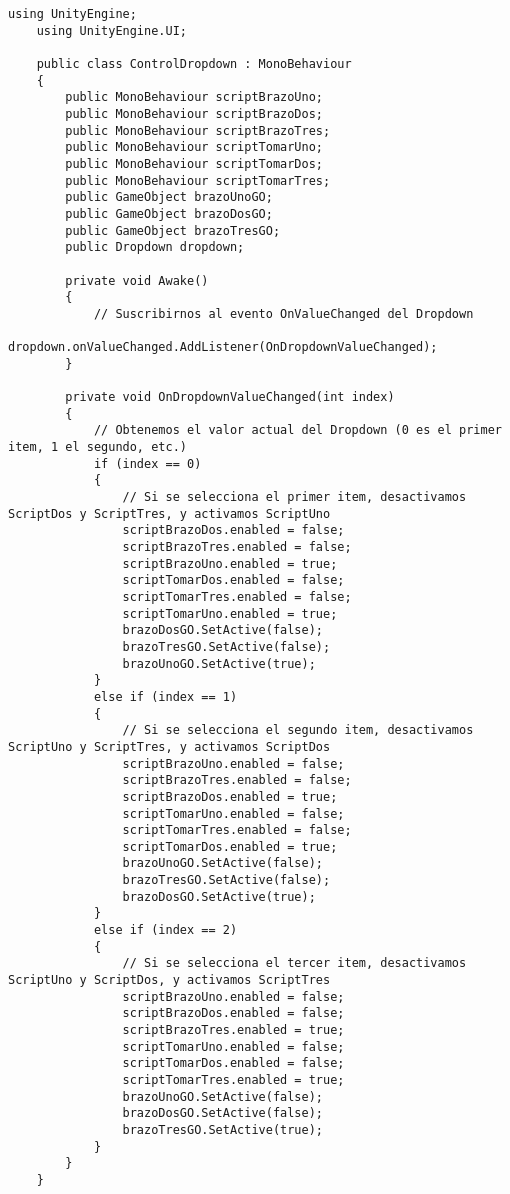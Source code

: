 \begin{lstlisting}[frame=single]
    using UnityEngine;
    using UnityEngine.UI;

    public class ControlDropdown : MonoBehaviour
    {
        public MonoBehaviour scriptBrazoUno;
        public MonoBehaviour scriptBrazoDos;
        public MonoBehaviour scriptBrazoTres;
        public MonoBehaviour scriptTomarUno;
        public MonoBehaviour scriptTomarDos;
        public MonoBehaviour scriptTomarTres;
        public GameObject brazoUnoGO;
        public GameObject brazoDosGO;
        public GameObject brazoTresGO;
        public Dropdown dropdown;

        private void Awake()
        {
            // Suscribirnos al evento OnValueChanged del Dropdown
            dropdown.onValueChanged.AddListener(OnDropdownValueChanged);
        }

        private void OnDropdownValueChanged(int index)
        {
            // Obtenemos el valor actual del Dropdown (0 es el primer item, 1 el segundo, etc.)
            if (index == 0)
            {
                // Si se selecciona el primer item, desactivamos ScriptDos y ScriptTres, y activamos ScriptUno
                scriptBrazoDos.enabled = false;
                scriptBrazoTres.enabled = false;
                scriptBrazoUno.enabled = true;
                scriptTomarDos.enabled = false;
                scriptTomarTres.enabled = false;
                scriptTomarUno.enabled = true;
                brazoDosGO.SetActive(false);
                brazoTresGO.SetActive(false);
                brazoUnoGO.SetActive(true);
            }
            else if (index == 1)
            {
                // Si se selecciona el segundo item, desactivamos ScriptUno y ScriptTres, y activamos ScriptDos
                scriptBrazoUno.enabled = false;
                scriptBrazoTres.enabled = false;
                scriptBrazoDos.enabled = true;
                scriptTomarUno.enabled = false;
                scriptTomarTres.enabled = false;
                scriptTomarDos.enabled = true;
                brazoUnoGO.SetActive(false);
                brazoTresGO.SetActive(false);
                brazoDosGO.SetActive(true);
            }
            else if (index == 2)
            {
                // Si se selecciona el tercer item, desactivamos ScriptUno y ScriptDos, y activamos ScriptTres
                scriptBrazoUno.enabled = false;
                scriptBrazoDos.enabled = false;
                scriptBrazoTres.enabled = true;
                scriptTomarUno.enabled = false;
                scriptTomarDos.enabled = false;
                scriptTomarTres.enabled = true;
                brazoUnoGO.SetActive(false);
                brazoDosGO.SetActive(false);
                brazoTresGO.SetActive(true);
            }
        }
    }
\end{lstlisting}